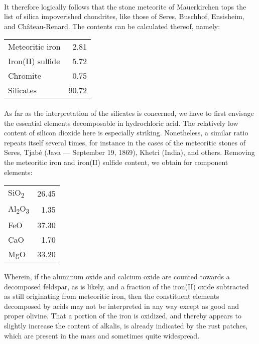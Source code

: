 \documentclass[a4paper, 12pt, oneside]{article}
\begin{document}
\paragraph{}
It therefore logically follows that the stone meteorite of Mauerkirchen tops the list of silica impoverished chondrites, like those of Seres, Buschhof, Ensisheim, and Château-Renard. The contents can be calculated thereof, namely:
\begin{center}
    \begin{tabular}{l r}
        Meteoritic iron & 2.81\\
        Iron(II) sulfide & 5.72\\
        Chromite & 0.75\\
        Silicates & 90.72\\
    \end{tabular}
\end{center}
\paragraph{}
As far as the interpretation of the silicates is concerned, we have to first envisage the essential elements decomposable in hydrochloric acid. The relatively low content of silicon dioxide here is especially striking. Nonetheless, a similar ratio repeats itself several times, for instance in the cases of the meteoritic stones of Seres, Tjabé (Java --- September 19, 1869), Khetri (India), and others. Removing the meteoritic iron and iron(II) sulfide content, we obtain for component elements:
\begin{center}
    \begin{tabular}{l r}
        SiO\textsubscript{2} & 26.45\\
        Al\textsubscript{2}O\textsubscript{3} & 1.35\\
        FeO & 37.30\\
        CaO & 1.70\\
        MgO & 33.20\\
    \end{tabular}
\end{center}
\paragraph{}
Wherein, if the aluminum oxide and calcium oxide are counted towards a decomposed feldspar, as is likely, and a fraction of the iron(II) oxide subtracted as still originating from meteoritic iron, then the constituent elements decomposed by acids may not be interpreted in any way except as good and proper olivine. That a portion of the iron is oxidized, and thereby appears to slightly increase the content of alkalis, is already indicated by the rust patches, which are present in the mass and sometimes quite widespread.
\end{document}
